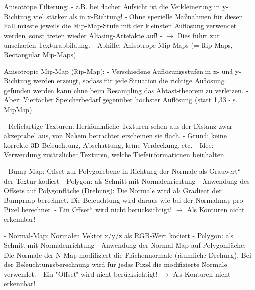 \documentclass[10pt,landscape]{article}
\makeatletter
\renewcommand{\subsection}{\@startsection{subsection}{2}{0mm}%
                                {-1explus -.5ex minus -.2ex}%
                                {0.5ex plus .2ex}%
                                {\normalfont\normalsize\bfseries}}
\makeatother
\begin{document}
\begin{multicols}{3}
  Anisotrope Filterung: 
  - z.B. bei flacher Aufsicht ist die Verkleinerung in y-Richtung viel stärker als in x-Richtung!
  - Ohne spezielle Maßnahmen für diesen Fall müsste jeweils die Mip-Map-Stufe mit der kleinsten Auflösung verwendet werden, sonst treten wieder Aliasing-Artefakte auf! 
  - $\rightarrow$ Dies führt zur unscharfen Texturabbildung.
  - Abhilfe: Anisotrope Mip-Maps (= Rip-Maps, Rectangular Mip-Maps)
  
  Anisotropic Mip-Map (Rip-Map):
  - Verschiedene Auflösungsstufen in x- und y-Richtung werden erzeugt, sodass für jede Situation die richtige Auflösung gefunden werden kann ohne beim Resampling das Abtast-theorem zu verletzen.
  - Aber: Vierfacher Speicherbedarf gegenüber höchster Auflösung (statt 1,33 - s. MipMap)
  
  
  - Reliefartige Texturen: Herkömmliche Texturen sehen aus der Distanz zwar akzeptabel aus, von Nahem betrachtet erscheinen sie flach.
  - Grund: keine korrekte 3D-Beleuchtung, Abschattung, keine Verdeckung, etc.
  - Idee: Verwendung zusätzlicher Texturen, welche Tiefeinformationen beinhalten
  
  - Bump Map: Offset zur Polygonebene in Richtung der Normale als Grauwert“ der Textur kodiert
  - Polygon: als Schnitt mit Normalenrichtung
  - Anwendung des Offsets auf Polygonfläche (Drehung): Die Normale wird als Gradient der Bumpmap berechnet. Die Beleuchtung wird daraus wie bei der Normalmap pro Pixel berechnet.
  - Ein Offset“ wird nicht berücksichtigt! $\rightarrow$ Als Konturen nicht erkennbar!
  
  
  - Normal-Map: Normalen Vektor x/y/z als RGB-Wert kodiert
  - Polygon: als Schnitt mit Normalenrichtung
  - Anwendung der Normal-Map auf Polygonfläche: Die Normale der N-Map modifiziert die Flächennormale (räumliche Drehung). Bei der Beleuchtungsberechnung wird für jedes Pixel die modifizierte Normale verwendet.
  - Ein "Offset" wird nicht berücksichtigt! $\rightarrow$ Als Konturen nicht erkennbar!
  

\end{multicols}
\end{document}
